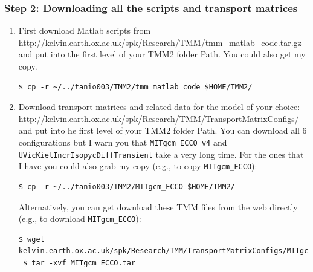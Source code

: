 \documentclass[a4paper]{article}
\def\noin{\noindent }
\begin{document}
\subsubsection{Step 2: Downloading all the scripts and transport matrices}
\begin{enumerate}
\item First download Matlab scripts from \\ 
\url{http://kelvin.earth.ox.ac.uk/spk/Research/TMM/tmm_matlab_code.tar.gz} and put into the first level of your TMM2 folder Path. You could also get my copy.
\begin{lstlisting}[style=DOS]
 $ cp -r ~/../tanio003/TMM2/tmm_matlab_code $HOME/TMM2/
\end{lstlisting}
\item Download transport matrices and related data for the model of your choice: \\ \url{http://kelvin.earth.ox.ac.uk/spk/Research/TMM/TransportMatrixConfigs/} and put into he first level of your TMM2 folder Path. You can download all 6 configurations but I warn you that \verb|MITgcm_ECCO_v4| and \verb|UVicKielIncrIsopycDiffTransient| take a very long time. For the ones that I have you could also grab my copy (e.g., to copy \verb|MITgcm_ECCO|):
\begin{lstlisting}[style=DOS]
 $ cp -r ~/../tanio003/TMM2/MITgcm_ECCO $HOME/TMM2/
\end{lstlisting}

\noin Alternatively, you can get download these TMM files from the web directly (e.g., to download \verb|MITgcm_ECCO|):
\begin{lstlisting}[style=DOS]
 $ wget kelvin.earth.ox.ac.uk/spk/Research/TMM/TransportMatrixConfigs/MITgcm_ECCO.tar
 $ tar -xvf MITgcm_ECCO.tar
\end{lstlisting}


\end{enumerate}
\end{document}
